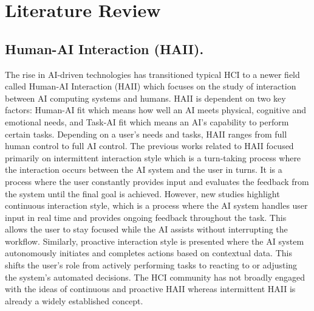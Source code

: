 \documentclass[conference]{IEEEtran}
\begin{document}
\section{Literature Review}

\subsection{Human-AI Interaction (HAII).}
The rise in AI-driven technologies has transitioned typical HCI to a newer field called Human-AI Interaction (HAII) which focuses on the study of interaction between AI computing systems and humans. HAII is dependent on two key factors: Human-AI fit which means how well an AI meets physical, cognitive and emotional needs, and Task-AI fit which means an AI’s capability to perform certain tasks. Depending on a user’s needs and tasks, HAII ranges from full human control to full AI control\cite{b3}. The previous works related to HAII focused primarily on intermittent interaction style which is a turn-taking process where the interaction occurs between the AI system and the user in turns. It is a process where the user constantly provides input and evaluates the feedback from the system until the final goal is achieved. However, new studies highlight continuous interaction style, which is a process where the AI system handles user input in real time and provides ongoing feedback throughout the task. This allows the user to stay focused while the AI assists without interrupting the workflow. Similarly, proactive interaction style is presented where the AI system autonomously initiates and completes actions based on contextual data. This shifts the user's role from actively performing tasks to reacting to or adjusting the system's automated decisions. The HCI community has not broadly engaged with the ideas of continuous and proactive HAII whereas intermittent HAII is already a widely established concept\cite{b4}.
\end{document}
